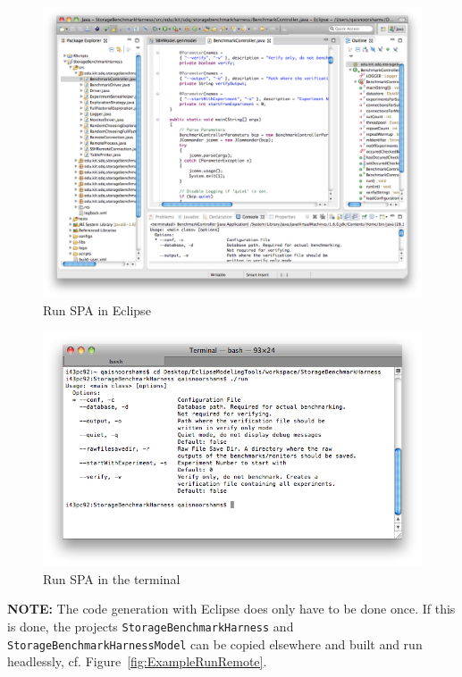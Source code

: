 \begin{figure}[htbp]
	\centering
	\includegraphics[scale=0.375]{graphics/example/RunEclipse.png}
	\caption{Run SPA in Eclipse}
 	\label{fig:ExampleRunEclipse}
\end{figure}

\begin{figure}[htbp]
	\centering
	\includegraphics[scale=0.375]{graphics/example/RunHeadless.png}
	\caption{Run SPA in the terminal}
 	\label{fig:ExampleRunHeadless}
\end{figure}

\textbf{NOTE:} The code generation with Eclipse does only have to be done once. If this is done, the projects \texttt{StorageBenchmarkHarness} and \texttt{StorageBenchmarkHarnessModel} can be copied elsewhere and built and run headlessly, cf. Figure~\ref{fig:ExampleRunRemote}. 

